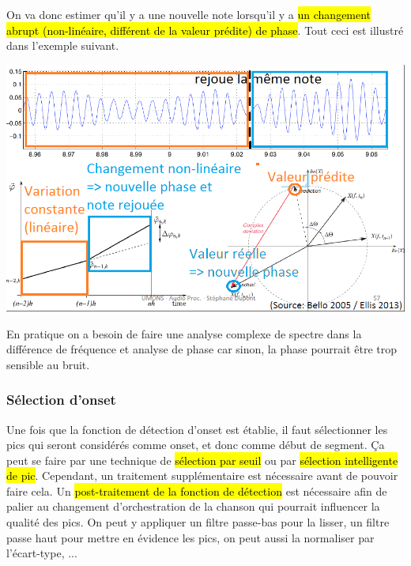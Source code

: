 \documentclass[letterpaper, 12pt]{article}
\newcommand{\alinea}{
\hspace*{0.5cm}}
\begin{document}
					On va donc estimer qu'il y a une nouvelle note lorsqu'il y a \hl{un changement abrupt (non-linéaire, différent de la
					valeur prédite) de phase}. Tout ceci est illustré dans l'exemple suivant.
				\begin{center}
					\includegraphics[width=\textwidth]{Images/phase}
				\end{center}
				\alinea En pratique on a besoin de faire une analyse complexe de spectre dans la différence de fréquence et analyse de phase
					car sinon, la phase pourrait être trop sensible au bruit.
			\subsubsection{Sélection d'onset}
				\alinea Une fois que la fonction de détection d'onset est établie, il faut sélectionner les pics qui seront considérés comme
					onset, et donc comme début de segment. Ça peut se faire par une technique de \hl{sélection par seuil} ou par \hl{sélection
					intelligente de pic}. Cependant, un traitement supplémentaire est nécessaire avant de pouvoir faire cela. Un 
					\hl{post-traitement de la fonction de détection} est nécessaire afin de palier au changement d'orchestration de la chanson
					qui pourrait influencer la qualité des pics. On peut y appliquer un filtre passe-bas pour la lisser, un filtre passe haut 
					pour mettre en évidence les pics, on peut aussi la normaliser par l'écart-type, ...
\end{document}
